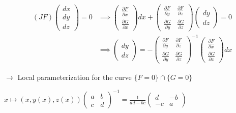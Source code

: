 \begin{enumerate}
          \begin{align*}
              (JF)\begin{pmatrix}
                      dx \\dy\\dz
                  \end{pmatrix}=0
               & \implies\begin{pmatrix}
                             \frac{\partial F}{\partial x} \\\frac{\partial G}{\partial x}
                         \end{pmatrix}dx
              +\begin{pmatrix}
                   \frac{\partial F}{\partial y} & \frac{\partial F}{\partial z} \\
                   \frac{\partial G}{\partial y} & \frac{\partial G}{\partial z}
               \end{pmatrix}
              \begin{pmatrix}
                  dy \\dz
              \end{pmatrix}=0                                                         \\
               & \implies\begin{pmatrix}
                             dy \\dz
                         \end{pmatrix}
              =-\begin{pmatrix}
                    \frac{\partial F}{\partial y} & \frac{\partial F}{\partial z} \\
                    \frac{\partial G}{\partial y} & \frac{\partial G}{\partial z}
                \end{pmatrix}^{-1}
              \begin{pmatrix}
                  \frac{\partial F}{\partial x} \\\frac{\partial G}{\partial x}
              \end{pmatrix}dx
          \end{align*}

          $\rightarrow$ Local parameterization for the curve $\{F=0\}\cap\{G=0\}$

          $x\mapsto(x,y(x),z(x))$\quad$\begin{pmatrix}
                  a & b \\
                  c & d
              \end{pmatrix}^{-1}
              =\frac{1}{ad-bc}\begin{pmatrix}
                  d  & -b \\
                  -c & a
              \end{pmatrix}$


\end{enumerate}
